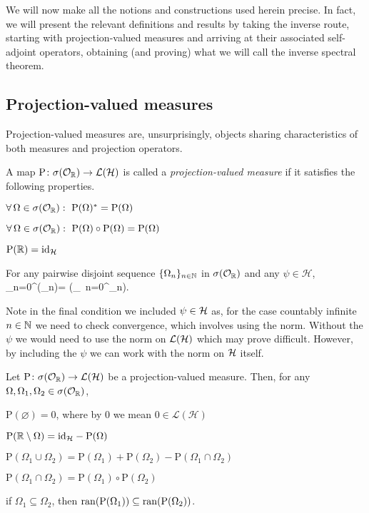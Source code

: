 We will now make all the notions and constructions used herein precise. In fact, we will present the relevant definitions and results by taking the inverse route, starting with projection-valued measures and arriving at their associated self-adjoint operators, obtaining (and proving) what we will call the inverse spectral theorem.

\subsection{Projection-valued measures}

Projection-valued measures are, unsurprisingly, objects sharing characteristics of both measures and projection operators.

\bd
A map $\mathrm{P}\colon \sigma(\mathcal{O}_{\mathbb{R}})\to\mathcal{L}(\mathcal{H})$ is called a \emph{projection-valued measure} if it satisfies the following properties.
\ben[label=(\roman*)]
\item $\forall\, \Omega \in \sigma(\mathcal{O}_{\mathbb{R}}) : \ \mathrm{P}(\Omega)^* = \mathrm{P}(\Omega) $
\item $\forall\, \Omega \in \sigma(\mathcal{O}_{\mathbb{R}}) : \ \mathrm{P}(\Omega)\circ \mathrm{P}(\Omega) = \mathrm{P}(\Omega) $
\item $\mathrm{P}(\mathbb{R})=\operatorname{id}_{\mathcal{H}}$
\item For any pairwise disjoint sequence $\{\Omega_n\}_{n\in\mathbb{N}}$ in $\sigma(\mathcal{O}_{\mathbb{R}})$ and any $\psi\in\mathcal{H}$,
\bse
\sum_{n=0}^{\infty}(\Omega_n)\psi = \biggl(\bigcup_{\, n=0}^{\infty}\Omega_n\biggr)\psi.
\ese
\een
\ed

\br 
Note in the final condition we included $\psi\in\mathcal{H}$ as, for the case countably infinite $n\in\mathbb{N}$ we need to check convergence, which involves using the norm. Without the $\psi$ we would need to use the norm on $\mathcal{L}(\mathcal{H})$ which may prove difficult. However, by including the $\psi$ we can work with the norm on $\mathcal{H}$ itself. 
\er 

\bl
Let $\mathrm{P}\colon \sigma(\mathcal{O}_{\mathbb{R}})\to\mathcal{L}(\mathcal{H})$ be a projection-valued measure. Then, for any $\Omega,\Omega_1,\Omega_2\in\sigma(\mathcal{O}_{\mathbb{R}})$,
\ben[label=(\roman*)]
\item $\mathrm{P}(\varnothing)=0$, where by $0$ we mean $0\in\mathcal{L}(\mathcal{H})$
\item $\mathrm{P}(\mathbb{R}\setminus \Omega)={\operatorname{id}_{\mathcal{H}}}-\mathrm{P}(\Omega)$
\item $\mathrm{P}(\Omega_1\cup\Omega_2)=\mathrm{P}(\Omega_1)+\mathrm{P}(\Omega_2)-\mathrm{P}(\Omega_1\cap\Omega_2)$
\item $\mathrm{P}(\Omega_1\cap\Omega_2)=\mathrm{P}(\Omega_1)\circ\mathrm{P}(\Omega_2)$
\item if $\Omega_1\subseteq\Omega_2$, then $\operatorname{ran}(\mathrm{P}(\Omega_1))\subseteq \operatorname{ran}(\mathrm{P}(\Omega_2))$.
\een
\el

